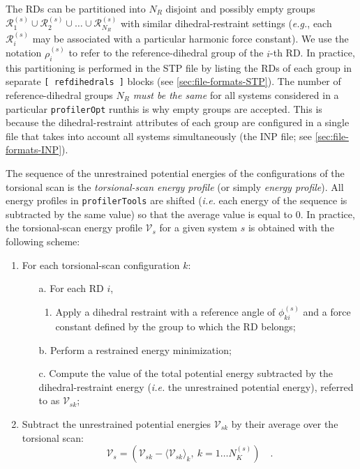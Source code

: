 \documentclass[10pt,a4paper,openany]{memoir}
\numberwithin{equation}{section}
\newcommand{\profileropt}[0]{\texttt{profilerOpt}}
\newcommand{\profilertools}[0]{\texttt{profilerTools}}
\begin{document}
The RDs can be partitioned into $N_R$ disjoint and possibly empty
groups
$\mathcal{R}_1^{(s)} \cup \mathcal{R}_2^{(s)} \cup \ldots \cup
\mathcal{R}_{N_R}^{(s)}$ with similar dihedral-restraint settings
(\textit{e.g.}, each $\mathcal{R}_i^{(s)}$ may be associated with a
particular harmonic force constant).  We use the notation
$\rho_i^{(s)}$ to refer to the reference-dihedral group of the $i$-th
RD. In practice, this partitioning is performed in the STP file by
listing the RDs of each group in separate \texttt{[~refdihedrals~]}
blocks (see \autoref{sec:file-formats-STP}).  The number of
reference-dihedral groups $N_R$ \textit{must be the same} for all
systems considered in a particular \profileropt{} run\textemdash{}this
is why empty groups are accepted.  This is because the
dihedral-restraint attributes of each group are configured in a single
file that takes into account all systems simultaneously (the INP file;
see \autoref{sec:file-formats-INP}).

The sequence of the unrestrained potential energies of the
configurations of the torsional scan is the \textit{torsional-scan
  energy profile} (or simply \textit{energy profile}).  All energy
profiles in \profilertools{} are shifted (\textit{i.e.} each energy of
the sequence is subtracted by the same value) so that the average
value is equal to 0.
In practice, the torsional-scan energy profile $\mathcal{V}_s$ for a
given system $s$ is obtained with the following scheme:
\begin{enumerate}
\item For each torsional-scan configuration $k$:
  \begin{enumerate}
  \item[a.] For each RD $i$,
    \begin{enumerate}
    \item Apply a dihedral restraint with a reference angle of
      $\phi_{ki}^{(s)}$ and a force constant defined by the group to
      which the RD belongs;
  \end{enumerate}
\item [b.] Perform a restrained energy minimization;
  \item [c.] Compute the value of the total potential energy
    subtracted by the dihedral-restraint energy (\textit{i.e.} the
    unrestrained potential energy), referred to as $\mathcal{V}_{sk}$;
\end{enumerate}
\item Subtract the unrestrained potential energies
  $\mathcal{V}_{sk}$ by their average over the torsional scan:
  \begin{equation}
  \label{eq:ga-tors-scan}
  \mathcal{V}_s = \left( \mathcal{V}_{sk} - \langle {\mathcal{V}_{sk} \rangle_k},\ k=1\ldots N_K^{(s)} \right) \quad .
\end{equation}
\end{enumerate}
\end{document}
